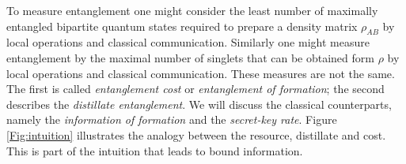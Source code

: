     To measure entanglement one might consider the least number of maximally entangled bipartite quantum states required to prepare a density matrix $\rho_{AB}$ by local operations and classical communication. 
    Similarly one might measure entanglement by the maximal number of singlets that can be obtained form $\rho$ by local operations and classical communication. 
    These measures are not the same. 
    The first is called \emph{entanglement cost} or \emph{entanglement of formation}; the second describes the \emph{distillate entanglement}. 
    We will discuss the classical counterparts, namely the \emph{information of formation} and the \emph{secret-key rate}.
    Figure \ref{Fig:intuition} illustrates the analogy between the resource, distillate and cost.
    This is part of the intuition that leads to bound information.
    
    